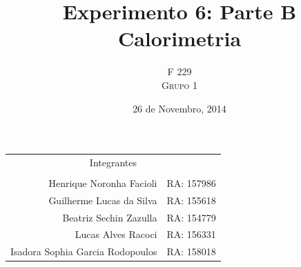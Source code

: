 \documentclass[a4paper]{article}
\title{Experimento 6:  Parte B \\ Calorimetria} %
\author{F 229 \\ \textsc{Grupo 1}}
\date{26 de Novembro, 2014}
\providecommand{\tabularnewline}{\\}
\begin{document}
	\maketitle



	\begin{center}
		\begin{tabular}{rr}
				\multicolumn{2}{c}{Integrantes}\tabularnewline
			                                  & \tabularnewline
			        Henrique Noronha Facioli  & RA: 157986 \tabularnewline
			        Guilherme Lucas da Silva  & RA: 155618 \tabularnewline
			          Beatriz Sechin Zazulla  & RA: 154779 \tabularnewline
			              Lucas Alves Racoci  & RA: 156331 \tabularnewline
			Isadora Sophia Garcia Rodopoulos  & RA: 158018 \tabularnewline
		\end{tabular}
	\par\end{center}

\end{document}
